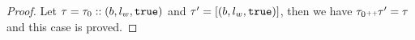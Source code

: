 \begin{proof}
      Let $\mathtt{\tau} = \mathtt{\tau}_0 ::(b, l_w, \mathtt{true})$ and $\mathtt{\tau}' =  [(b, l_w, \mathtt{true})]$,
      then we have $\mathtt{\tau}_0 {\scriptscriptstyle ++} \mathtt{\tau}' = \mathtt{\tau}$ and this case is proved.

\end{proof}
